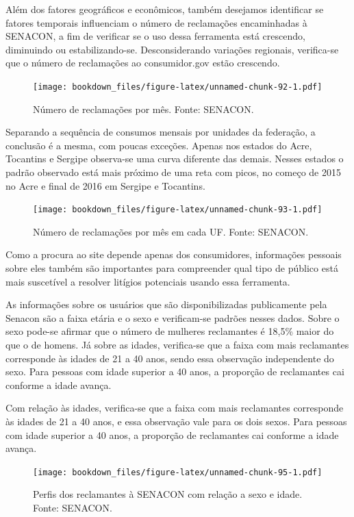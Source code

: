 \documentclass[]{report}
\begin{document}
Além dos fatores geográficos e econômicos, também desejamos identificar
se fatores temporais influenciam o número de reclamações encaminhadas à
SENACON, a fim de verificar se o uso dessa ferramenta está crescendo,
diminuindo ou estabilizando-se. Desconsiderando variações regionais,
verifica-se que o número de reclamações ao consumidor.gov estão
crescendo.

\begin{figure}[htbp]
\centering
\texttt{[image: bookdown\_files/figure-latex/unnamed-chunk-92-1.pdf]}
\caption{\label{fig:unnamed-chunk-92}Número de reclamações por mês. Fonte:
SENACON.}
\end{figure}

Separando a sequência de consumos mensais por unidades da federação, a
conclusão é a mesma, com poucas exceções. Apenas nos estados do Acre,
Tocantins e Sergipe observa-se uma curva diferente das demais. Nesses
estados o padrão observado está mais próximo de uma reta com picos, no
começo de 2015 no Acre e final de 2016 em Sergipe e Tocantins.

\begin{figure}[htbp]
\centering
\texttt{[image: bookdown\_files/figure-latex/unnamed-chunk-93-1.pdf]}
\caption{\label{fig:unnamed-chunk-93}Número de reclamações por mês em cada
UF. Fonte: SENACON.}
\end{figure}

Como a procura ao site depende apenas dos consumidores, informações
pessoais sobre eles também são importantes para compreender qual tipo de
público está mais suscetível a resolver litígios potenciais usando essa
ferramenta.

As informações sobre os usuários que são disponibilizadas publicamente
pela Senacon são a faixa etária e o sexo e verificam-se padrões nesses
dados. Sobre o sexo pode-se afirmar que o número de mulheres reclamantes
é 18,5\% maior do que o de homens. Já sobre as idades, verifica-se que a
faixa com mais reclamantes corresponde às idades de 21 a 40 anos, sendo
essa observação independente do sexo. Para pessoas com idade superior a
40 anos, a proporção de reclamantes cai conforme a idade avança.

Com relação às idades, verifica-se que a faixa com mais reclamantes
corresponde às idades de 21 a 40 anos, e essa observação vale para os
dois sexos. Para pessoas com idade superior a 40 anos, a proporção de
reclamantes cai conforme a idade avança.

\begin{figure}[htbp]
\centering
\texttt{[image: bookdown\_files/figure-latex/unnamed-chunk-95-1.pdf]}
\caption{\label{fig:unnamed-chunk-95}Perfis dos reclamantes à SENACON com
relação a sexo e idade. Fonte: SENACON.}
\end{figure}
\end{document}
